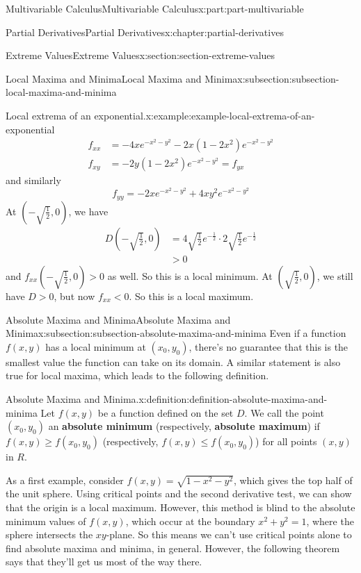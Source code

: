 \documentclass[twoside,10pt,]{tufte-book}
\newcommand{\terminology}[1]{\textbf{#1}}
\numberwithin{equation}{part}
\begin{document}
\begin{partptx}{Multivariable Calculus}{}{Multivariable Calculus}{}{}{x:part:part-multivariable}
\begin{chapterptx}{Partial Derivatives}{}{Partial Derivatives}{}{}{x:chapter:partial-derivatives}
\begin{sectionptx}{Extreme Values}{}{Extreme Values}{}{}{x:section:section-extreme-values}
\begin{subsectionptx}{Local Maxima and Minima}{}{Local Maxima and Minima}{}{}{x:subsection:subsection-local-maxima-and-minima}
\begin{example}{Local extrema of an exponential.}{x:example:example-local-extrema-of-an-exponential}
\begin{align*}
f_{xx} & = -4xe^{-x^{2} - y^{2}} - 2x(1 - 2x^{2})e^{-x^{2} - y^{2}} \\
f_{xy} & = -2y(1-2x^{2})e^{-x^{2} - y^{2}} = f_{yx} 
\end{align*}
and similarly%
\begin{equation*}
f_{yy} = -2xe^{-x^{2} - y^{2}} + 4xy^{2}e^{-x^{2} - y^{2}}
\end{equation*}
At \((-\sqrt{\frac{1}{2}},0)\), we have%
\begin{align*}
D\left(-\sqrt{\frac{1}{2}},0\right) & = 4\sqrt{\frac{1}{2}}e^{-\frac{1}{2}}\cdot2\sqrt{\frac{1}{2}}e^{-\frac{1}{2}}\\
& > 0 
\end{align*}
and \(f_{xx}(-\sqrt{\frac{1}{2}},0) >0\) as well. So this is a local minimum. At \((\sqrt{\frac{1}{2}},0)\), we still have \(D>0\), but now \(f_{xx}<0\). So this is a local maximum.%
\end{example}
\end{subsectionptx}
%
%
\typeout{************************************************}
\typeout{************************************************}
%
\begin{subsectionptx}{Absolute Maxima and Minima}{}{Absolute Maxima and Minima}{}{}{x:subsection:subsection-absolute-maxima-and-minima}
Even if a function \(f(x,y)\) has a local minimum at \((x_{0},y_{0})\), there's no guarantee that this is the smallest value the function can take on its domain. A similar statement is also true for local maxima, which leads to the following definition.%
\begin{definition}{Absolute Maxima and Minima.}{x:definition:definition-absolute-maxima-and-minima}%
%
Let \(f(x,y)\) be a function defined on the set \(D\). We call the point \((x_{0},y_{0})\) an \terminology{absolute minimum} (respectively, \terminology{absolute maximum}) if \(f(x,y)\geq f(x_{0},y_{0})\) (respectively, \(f(x,y)\leq f(x_{0},y_{0})\)) for all points \((x,y)\) in \(R\).%
\end{definition}
As a first example, consider \(f(x,y) = \sqrt{1 - x^{2} - y^{2}}\), which gives the top half of the unit sphere. Using critical points and the second derivative test, we can show that the origin is a local maximum. However, this method is blind to the absolute minimum values of \(f(x,y)\), which occur at the boundary \(x^{2} + y^{2} = 1\), where the sphere intersects the \(xy\)-plane. So this means we can't use critical points alone to find absolute maxima and minima, in general. However, the following theorem says that they'll get us most of the way there.%

\end{subsectionptx}
\end{sectionptx}
\end{chapterptx}
\end{partptx}
\end{document}
